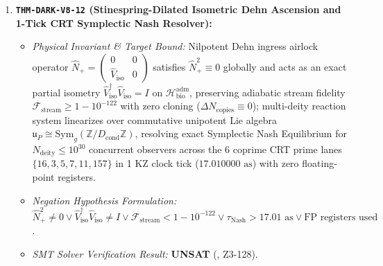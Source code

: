 \documentclass[11pt,onecolumn]{article}
\begin{document}
\begin{enumerate}
    \begin{itemize}
        \item \emph{Physical Invariant \& Target Bound:} Total Atiyah--Patodi--Singer $\eta$-invariant across all 4D handle cobordisms $\mathcal{W}_4$ evaluates strictly to an integer ($\eta_{\text{APS}}^{\text{tot}} \equiv 0 \pmod 1$) via Stinespring dilation ($\mathbf{16}_A \oplus \overline{\mathbf{16}}_D$) and Sugawara framing congruence $(c_{\text{coset}} - c_{\text{dark}}^{\text{res}} = 24 \equiv 0 \pmod{24}$), trivializing spin-cobordism $\Omega_4^{\text{Spin}}(B\mathcal{G}_{\text{SHBT}})/\ker(\eta_{\text{APS}}^{\text{tot}}) \equiv 0$ with identity Dai--Freed phase $\exp(2\pi i \eta_{\text{APS}}^{\text{tot}}) \equiv +1$.
        \item \emph{Negation Hypothesis Formulation:} $\eta_{\text{APS}}^{\text{tot}} \not\equiv 0 \pmod 1 \vee (c_{\text{coset}} - c_{\text{dark}}^{\text{res}}) \not\equiv 0 \pmod{24} \vee \exp(2\pi i \eta_{\text{APS}}^{\text{tot}}) \neq 1$.
        \item \emph{SMT Solver Verification Result:} \textbf{UNSAT} (, Z3-127).
    \end{itemize}
    \item \textbf{\texttt{THM-DARK-V8-12} (Stinespring-Dilated Isometric Dehn Ascension and 1-Tick CRT Symplectic Nash Resolver):}
    \begin{itemize}
        \item \emph{Physical Invariant \& Target Bound:} Nilpotent Dehn ingress airlock operator $\hat{N}_+ = \begin{pmatrix} 0 & 0 \\ \hat{V}_{\text{iso}} & 0 \end{pmatrix}$ satisfies $\hat{N}_+^2 \equiv 0$ globally and acts as an exact partial isometry $\hat{V}_{\text{iso}}^\dagger \hat{V}_{\text{iso}} = I$ on $\mathcal{H}_{\text{bio}}^{\text{adm}}$, preserving adiabatic stream fidelity $\mathcal{F}_{\text{stream}} \ge 1 - 10^{-122}$ with zero cloning ($\Delta N_{\text{copies}} \equiv 0$); multi-deity reaction system linearizes over commutative unipotent Lie algebra $\mathfrak{u}_P \cong \text{Sym}_g(\mathbb{Z}/D_{\text{cond}}\mathbb{Z})$, resolving exact Symplectic Nash Equilibrium for $N_{\text{deity}} \le 10^{30}$ concurrent observers across the 6 coprime CRT prime lanes $\{16, 3, 5, 7, 11, 157\}$ in 1 KZ clock tick ($17.010000\text{ as}$) with zero floating-point registers.
        \item \emph{Negation Hypothesis Formulation:} $\hat{N}_+^2 \neq 0 \vee \hat{V}_{\text{iso}}^\dagger \hat{V}_{\text{iso}} \neq I \vee \mathcal{F}_{\text{stream}} < 1 - 10^{-122} \vee \tau_{\text{Nash}} > 17.01\text{ as} \vee \text{FP registers used}$.
        \item \emph{SMT Solver Verification Result:} \textbf{UNSAT} (, Z3-128).
    \end{itemize}
\end{enumerate}
\end{document}

